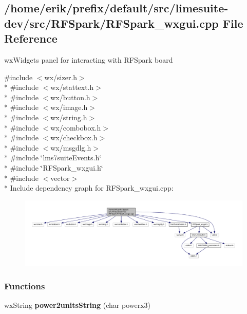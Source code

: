 \subsection{/home/erik/prefix/default/src/limesuite-\/dev/src/\+R\+F\+Spark/\+R\+F\+Spark\+\_\+wxgui.cpp File Reference}
\label{RFSpark__wxgui_8cpp}


wx\+Widgets panel for interacting with R\+F\+Spark board  


{\ttfamily \#include $<$wx/sizer.\+h$>$}\\*
{\ttfamily \#include $<$wx/stattext.\+h$>$}\\*
{\ttfamily \#include $<$wx/button.\+h$>$}\\*
{\ttfamily \#include $<$wx/image.\+h$>$}\\*
{\ttfamily \#include $<$wx/string.\+h$>$}\\*
{\ttfamily \#include $<$wx/combobox.\+h$>$}\\*
{\ttfamily \#include $<$wx/checkbox.\+h$>$}\\*
{\ttfamily \#include $<$wx/msgdlg.\+h$>$}\\*
{\ttfamily \#include \char`\"{}lms7suite\+Events.\+h\char`\"{}}\\*
{\ttfamily \#include \char`\"{}R\+F\+Spark\+\_\+wxgui.\+h\char`\"{}}\\*
{\ttfamily \#include $<$vector$>$}\\*
Include dependency graph for R\+F\+Spark\+\_\+wxgui.\+cpp\+:
\nopagebreak
\begin{figure}[H]
\begin{center}
\leavevmode
\includegraphics[width=350pt]{d1/df3/RFSpark__wxgui_8cpp__incl}
\end{center}
\end{figure}
\subsubsection*{Functions}
\begin{DoxyCompactItemize}
\item 
wx\+String {\bf power2units\+String} (char powerx3)
\end{DoxyCompactItemize}


